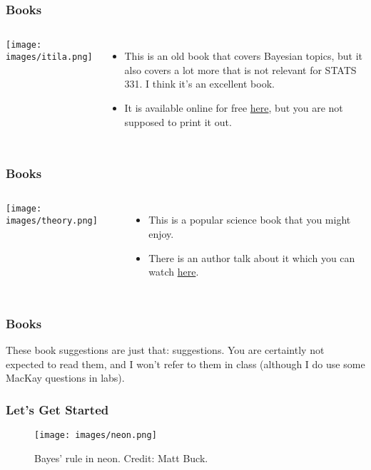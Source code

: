 \documentclass{beamer}
\begin{document}
\begin{frame}
\frametitle{Books}

    \begin{columns} %
        \texttt{[image: images/itila.png]}

        \begin{itemize}
        \item This is an old book that covers Bayesian topics, but it also
        covers a lot more that is not relevant for STATS 331. I think it's an
        excellent book.\pause
        \item It is available online for free
            \href{http://www.inference.org.uk/itprnn/book.pdf}{here}, but you
            are not supposed to print it out.
        \end{itemize}
     \end{columns}

\end{frame}


\begin{frame}
\frametitle{Books}

    \begin{columns} %
        \texttt{[image: images/theory.png]}

        \begin{itemize}
        \item This is a popular science book that you might enjoy.\pause
        \item There is an author talk about it which you can watch
            \href{https://www.youtube.com/watch?v=8oD6eBkjF9o}{here}.
        \end{itemize}
     \end{columns}

\end{frame}


\begin{frame}
\frametitle{Books}
These book suggestions are just that: suggestions. You are certaintly not
expected to read them, and I won't refer to them in class (although I do use
some MacKay questions in labs).

\end{frame}

\begin{frame}
\frametitle{Let's Get Started}

\begin{figure}[!h]
\centering
\texttt{[image: images/neon.png]}
\caption{Bayes' rule in neon. Credit: Matt Buck.}
\end{figure}

\end{frame}
\end{document}
